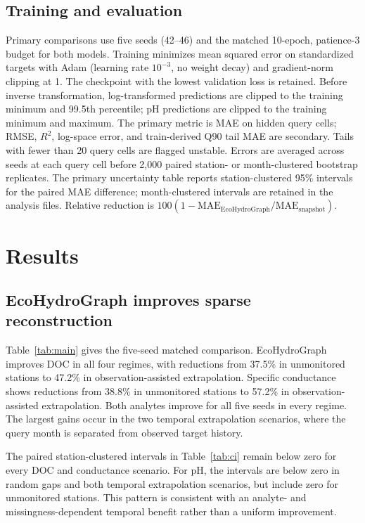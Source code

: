 \documentclass[11pt]{article}
\begin{document}
\subsection{Training and evaluation}
Primary comparisons use five seeds (42--46) and the matched 10-epoch, patience-3 budget for both models. Training minimizes mean squared error on standardized targets with Adam (learning rate $10^{-3}$, no weight decay) and gradient-norm clipping at 1. The checkpoint with the lowest validation loss is retained. Before inverse transformation, log-transformed predictions are clipped to the training minimum and 99.5th percentile; pH predictions are clipped to the training minimum and maximum. The primary metric is MAE on hidden query cells; RMSE, $R^2$, log-space error, and train-derived Q90 tail MAE are secondary. Tails with fewer than 20 query cells are flagged unstable. Errors are averaged across seeds at each query cell before 2,000 paired station- or month-clustered bootstrap replicates. The primary uncertainty table reports station-clustered 95\% intervals for the paired MAE difference; month-clustered intervals are retained in the analysis files. Relative reduction is $100(1-\mathrm{MAE}_{\mathrm{EcoHydroGraph}}/\mathrm{MAE}_{\mathrm{snapshot}})$.

\section{Results}
\subsection{EcoHydroGraph improves sparse reconstruction}
Table~\ref{tab:main} gives the five-seed matched comparison. EcoHydroGraph improves DOC in all four regimes, with reductions from 37.5\% in unmonitored stations to 47.2\% in observation-assisted extrapolation. Specific conductance shows reductions from 38.8\% in unmonitored stations to 57.2\% in observation-assisted extrapolation. Both analytes improve for all five seeds in every regime. The largest gains occur in the two temporal extrapolation scenarios, where the query month is separated from observed target history.

The paired station-clustered intervals in Table~\ref{tab:ci} remain below zero for every DOC and conductance scenario. For pH, the intervals are below zero in random gaps and both temporal extrapolation scenarios, but include zero for unmonitored stations. This pattern is consistent with an analyte- and missingness-dependent temporal benefit rather than a uniform improvement.
\end{document}
